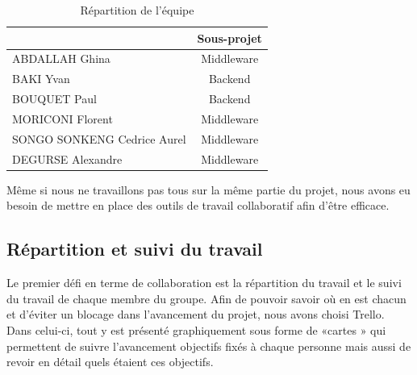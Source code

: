 \documentclass[a4paper]{article}
\begin{document}
\begin{table}[!h]

	\begin{center}
		\begin{tabular}{|l|c|}

			\hline
			\rowcolor{headb} \multicolumn{1}{|c|}{{\color{white}\'Etudiant}} & {\color{white}Sous-projet} \\
			\hline
			\rowcolor{lineb}
			ABDALLAH Ghina                                                   & Middleware                 \\
			BAKI Yvan                                                        & Backend                    \\
			\rowcolor{lineb}
			BOUQUET Paul                                                     & Backend                    \\
			MORICONI Florent                                                 & Middleware                 \\
			\rowcolor{lineb}
			SONGO SONKENG Cedrice Aurel                                      & Middleware                 \\
			DEGURSE Alexandre                                                & Middleware                 \\
			\hline
		\end{tabular}

		\caption{Répartition de l'équipe}

	\end{center}
\end{table}

Même si nous ne travaillons pas tous sur la même partie du projet, nous avons eu besoin de mettre
en place des outils de travail collaboratif afin d’être efficace.

\subsection{Répartition et suivi du travail}

Le premier défi en terme de collaboration est la répartition du travail et le suivi du travail de
chaque membre du groupe. Afin de pouvoir savoir où en est chacun et d’éviter un blocage dans
l’avancement du projet, nous avons choisi Trello. Dans celui-ci, tout y est présenté graphiquement
sous forme de «cartes » qui permettent de suivre l’avancement objectifs fixés à chaque personne
mais aussi de revoir en détail quels étaient ces objectifs.
\\
\end{document}
